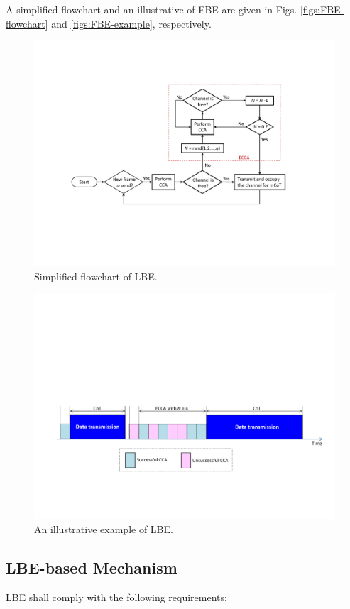 A simplified flowchart and an illustrative of FBE are given in Figs. \ref{figs:FBE-flowchart} and \ref{figs:FBE-example}, respectively.


\begin{figure}[!t]
	\centering
	\includegraphics[width=0.9\columnwidth]{figures2/LBE-flowchart}
	\caption{Simplified flowchart of LBE.}
	\label{figs:LBE-flowchart}
\end{figure}

\begin{figure}[!t]
	\centering
	\includegraphics[width=0.9\columnwidth]{figures2/LBE-example}
	\caption{An illustrative example of LBE.}
	\label{figs:LBE-example}
\end{figure}

\subsection{LBE-based Mechanism}
\label{etsi-lbt:lbe}
LBE shall comply with the following requirements:

